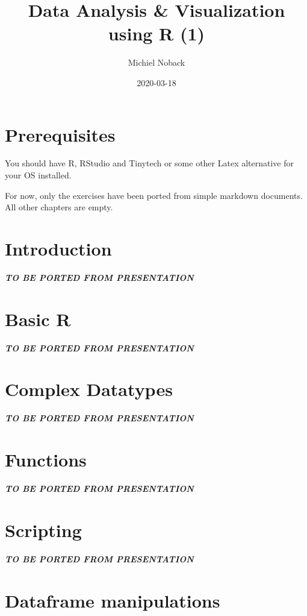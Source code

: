 \documentclass[]{book}
\title{Data Analysis \& Visualization using R (1)}
\author{Michiel Noback}
\date{2020-03-18}
\begin{document}
\maketitle

{
\setcounter{tocdepth}{1}
\tableofcontents
}
\hypertarget{prerequisites}{%
\chapter{Prerequisites}\label{prerequisites}}

You should have R, RStudio and Tinytech or some other Latex alternative for your OS installed.

For now, only the exercises have been ported from simple markdown documents. All other chapters are empty.

\hypertarget{intro}{%
\chapter{Introduction}\label{intro}}

\textbf{\emph{TO BE PORTED FROM PRESENTATION}}

\hypertarget{basic-r}{%
\chapter{Basic R}\label{basic-r}}

\textbf{\emph{TO BE PORTED FROM PRESENTATION}}

\hypertarget{complex-datatypes}{%
\chapter{Complex Datatypes}\label{complex-datatypes}}

\textbf{\emph{TO BE PORTED FROM PRESENTATION}}

\hypertarget{functions}{%
\chapter{Functions}\label{functions}}

\textbf{\emph{TO BE PORTED FROM PRESENTATION}}

\hypertarget{scripting}{%
\chapter{Scripting}\label{scripting}}

\textbf{\emph{TO BE PORTED FROM PRESENTATION}}

\hypertarget{dataframe-manipulations}{%
\chapter{Dataframe manipulations}\label{dataframe-manipulations}}
\end{document}
